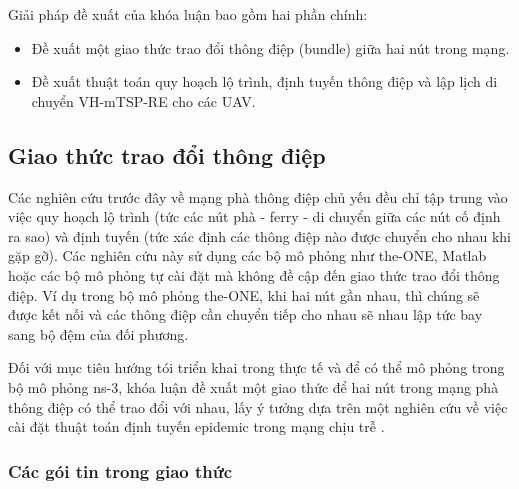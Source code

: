 \documentclass[a4paper]{article}
\begin{document}

Giải pháp đề xuất của khóa luận bao gồm hai phần chính:
\begin{itemize}
  \item Đề xuất một giao thức trao đổi thông điệp (bundle) giữa hai nút trong mạng.
  \item Đề xuất thuật toán quy hoạch lộ trình, định tuyến thông điệp và lập lịch di chuyển VH-mTSP-RE cho các UAV.
\end{itemize}
\subsection{Giao thức trao đổi thông điệp}
Các nghiên cứu trước đây về mạng phà thông điệp chủ yếu đều chỉ tập trung vào việc quy hoạch lộ trình (tức các nút phà - ferry - di chuyển giữa các nút cố định ra sao) và định tuyến (tức xác định các thông điệp nào được chuyển cho nhau khi gặp gỡ). Các nghiên cứu này sử dụng các bộ mô phỏng như the-ONE, Matlab hoặc các bộ mô phỏng tự cài đặt mà không đề cập đến giao thức trao đổi thông điệp. Ví dụ trong bộ mô phỏng the-ONE, khi hai nút gần nhau, thì chúng sẽ được kết nối và các thông điệp cần chuyển tiếp cho nhau sẽ nhau lập tức bay sang bộ đệm của đối phương.

Đối với mục tiêu hướng tói triển khai trong thực tế và để có thể mô phỏng trong bộ mô phỏng ns-3, khóa luận đề xuất một giao thức để hai nút trong mạng phà thông điệp có thể trao đổi với nhau, lấy ý tưởng dựa trên một nghiên cứu về việc cài đặt thuật toán định tuyến epidemic trong mạng chịu trễ \cite{ns3-epidemic-2018}.

\subsubsection{Các gói tin trong giao thức}
\end{document}
